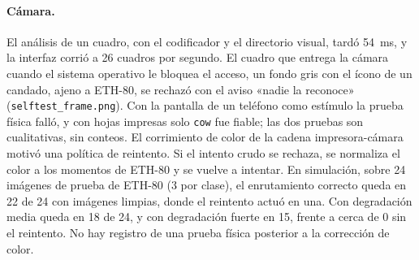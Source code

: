 \paragraph{Cámara.}
El análisis de un cuadro, con el codificador y el directorio visual, tardó 54~ms, y la
interfaz corrió a 26 cuadros por segundo.
El cuadro que entrega la cámara cuando el sistema operativo le bloquea el acceso, un
fondo gris con el ícono de un candado, ajeno a ETH-80, se rechazó con el aviso «nadie la
reconoce» (\texttt{selftest\_frame.png}).
Con la pantalla de un teléfono como estímulo la prueba física falló, y con hojas impresas
solo \texttt{cow} fue fiable; las dos pruebas son cualitativas, sin conteos.
El corrimiento de color de la cadena impresora-cámara motivó una política de reintento.
Si el intento crudo se rechaza, se normaliza el color a los momentos de ETH-80 y se
vuelve a intentar.
En simulación, sobre 24 imágenes de prueba de ETH-80 (3 por clase), el enrutamiento
correcto queda en 22 de 24 con imágenes limpias, donde el reintento actuó en una.
Con degradación media queda en 18 de 24, y con degradación fuerte en 15, frente a cerca
de 0 sin el reintento.
No hay registro de una prueba física posterior a la corrección de color.
